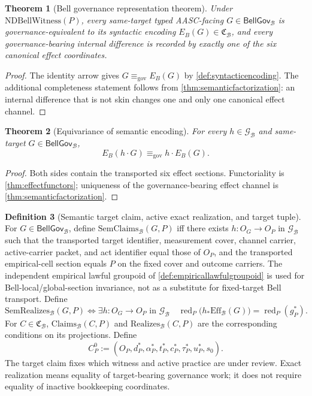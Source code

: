 \documentclass[11pt]{article}
\newtheorem{theorem}{Theorem}[section]
\theoremstyle{definition}
\newtheorem{definition}[theorem]{Definition}
\newcommand{\Bell}{\mathcal{B}}
\newcommand{\NDBell}{\mathrm{NDBellWitness}}
\newcommand{\BellLaw}{\mathscr{G}_{\Bell}}
\newcommand{\GovEq}{\equiv_{\mathrm{gov}}}
\newcommand{\BellConstr}{\mathfrak{C}_{\Bell}}
\newcommand{\ClaimsBell}{\mathrm{Claims}_{\Bell}}
\newcommand{\BellGov}{\mathsf{BellGov}_{\Bell}}
\newcommand{\GovEff}{\mathrm{Eff}_{\Bell}}
\newcommand{\RealizesBell}{\mathrm{Realizes}_{\Bell}}
\newcommand{\SemClaims}{\mathrm{SemClaims}_{\Bell}}
\newcommand{\SemRealizes}{\mathrm{SemRealizes}_{\Bell}}
\newcommand{\ActRed}{\operatorname{red}_{P}}
\begin{document}
\begin{theorem}[Bell governance representation theorem]\label{thm:governancerepresentation}
Under $\NDBell(P)$, every same-target typed AASC-facing $G\in\BellGov$ is governance-equivalent to its syntactic encoding $E_B(G)\in\BellConstr$, and every governance-bearing internal difference is recorded by exactly one of the six canonical effect coordinates.
\end{theorem}
\begin{proof}
The identity arrow gives $G\GovEq E_B(G)$ by \cref{def:syntacticencoding}. The additional completeness statement follows from \cref{thm:semanticfactorization}: an internal difference that is not skin changes one and only one canonical effect channel.
\end{proof}

\begin{theorem}[Equivariance of semantic encoding]\label{thm:encodingequivariance}
For every $h\in\BellLaw$ and same-target $G\in\BellGov$,
\[
E_B(h\!\cdot\!G)\GovEq h\!\cdot\!E_B(G).
\]
\end{theorem}
\begin{proof}
Both sides contain the transported six effect sections. Functoriality is \cref{thm:effectfunctors}; uniqueness of the governance-bearing effect channel is \cref{thm:semanticfactorization}.
\end{proof}

\begin{definition}[Semantic target claim, active exact realization, and target tuple]\label{def:semanticrealization}
For $G\in\BellGov$, define $\SemClaims(G,P)$ iff there exists $h:O_G\to O_P$ in $\BellLaw$ such that the transported target identifier, measurement cover, channel carrier, active-carrier packet, and act identifier equal those of $O_P$, and the transported empirical-cell section equals $P$ on the fixed cover and outcome carriers. The independent empirical lawful groupoid of \cref{def:empiricallawfulgroupoid} is used for Bell-local/global-section invariance, not as a substitute for fixed-target Bell transport. Define
\[
\SemRealizes(G,P)\iff
\exists h:O_G\to O_P\text{ in }\BellLaw\quad
\ActRed\bigl(h_*\GovEff(G)\bigr)=\ActRed(g_P^*).
\]
For $C\in\BellConstr$, $\ClaimsBell(C,P)$ and $\RealizesBell(C,P)$ are the corresponding conditions on its projections. Define
\[
C_P^0:=(O_P,d_P^*,\alpha_P^*,t_P^*,c_P^*,\tau_P^*,u_P^*,s_0).
\]
The target claim fixes which witness and active practice are under review. Exact realization means equality of target-bearing governance work; it does not require equality of inactive bookkeeping coordinates.
\end{definition}
\end{document}
